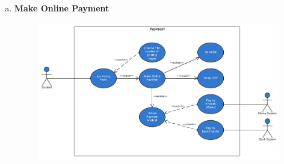 \begin{enumerate}[a)]
    \newpage
    \item{\textbf{Make Online Payment}}
    \begin{center}
    \begin{figure}[htp]
    \begin{center}
     \includegraphics[scale=.62]{images/Task1/payment.png}
    \end{center}
    \label{refhinh1}
    \end{figure}
    \end{center}


\end{enumerate}
